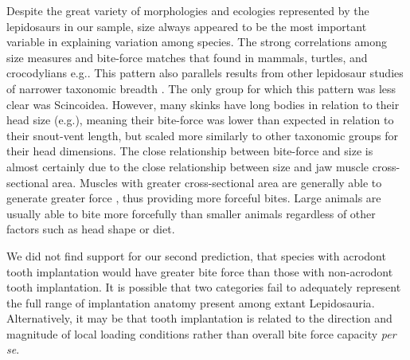 \documentclass[a4paper, 12pt]{article}
\begin{document}
Despite the great variety of morphologies and ecologies represented by the lepidosaurs in our sample, size always appeared to be the most important variable in explaining variation among species. 
The strong correlations among size measures and bite-force matches that found in mammals, turtles, and crocodylians e.g.\cite{aguirre2002ecomorphological,marshall2012ontogenetic,becerra2013biting,erickson2014comparative}.
This pattern also parallels results from other lepidosaur studies of narrower taxonomic breadth \cite{lailvaux2004performance,vanhooydonck2005does,MEASEY2009217,jones2020reproductive}.
The only group for which this pattern was less clear was Scincoidea. 
However, many skinks have long bodies in relation to their head size (e.g.\cite{wiens2006does}), meaning their bite-force was lower than expected in relation to their snout-vent length, but scaled more similarly to other taxonomic groups for their head dimensions. 
The close relationship between bite-force and size is almost certainly due to the close relationship between size and jaw muscle cross-sectional area. 
Muscles with greater cross-sectional area are generally able to generate greater force \cite{groning2013importance,sellers2017ontogeny}, thus providing more forceful bites. 
Large animals are usually able to bite more forcefully than smaller animals regardless of other factors such as head shape or diet. 

We did not find support for our second prediction, that species with acrodont tooth implantation would have greater bite force than those with non-acrodont tooth implantation. 
It is possible that two categories fail to adequately represent the full range of implantation anatomy present among extant Lepidosauria\cite{bertin2018current}.
Alternatively, it may be that tooth implantation is related to the direction and magnitude of local loading conditions rather than overall bite force capacity \textit{per se}.

 
\end{document}
